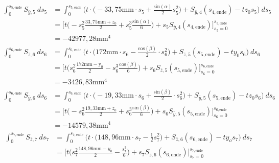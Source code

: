 \begin{itemize}
\begin{equation}
\begin{split}
			\int_{0}^{s_{5,\mathrm{ende}}} S_{\bar y,5}\ ds_5 &= \int_{0}^{s_{5,\mathrm{ende}}} \bigg(t\cdot\bigg(-33,75\mathrm{mm}\cdot s_5 +\frac{\mathrm{sin}(\alpha)}{2}s^2_5\bigg) + S_{\bar y,4}(s_{4,\mathrm{ende}})-tz_0s_5\bigg)\ ds_5\\\
			&=\bigg[t\bigg(-s_5^2\frac{33,75\mathrm{mm}+z_0}{2}+s_5^3\frac{\mathrm{sin}(\alpha)}{6}\bigg)+s_5S_{\bar y,4}(s_{4,\mathrm{ende}})\bigg]_{s_5=0}^{s_{5,\mathrm{ende}}}\\\
			&=-42977,28\mathrm{mm}^4
		\end{split}
	\end{equation}
	\begin{equation}
		\begin{split}
			\int_{0}^{s_{6,\mathrm{ende}}} S_{\bar z,6}\ ds_6 &= \int_{0}^{s_{6,\mathrm{ende}}} \bigg(t\cdot\bigg(172\mathrm{mm}\cdot s_6-\frac{\mathrm{cos}(\beta)}{2}\cdot s^2_6\bigg) + S_{\bar z,5}(s_{5,\mathrm{ende}})-ty_0s_6\bigg)\ ds_6\\\
			&=\bigg[t\bigg(s_6^2\frac{172\mathrm{mm-y_0}}{2}-s_6^3\frac{\mathrm{cos}(\beta)}{6}\bigg)+ s_6S_{\bar z,5}(s_{5,\mathrm{ende}})\bigg]_{s_6=0}^{s_{6,\mathrm{ende}}}\\\
			&=-3426,83\mathrm{mm}^4
		\end{split}
	\end{equation}
	\begin{equation}
		\begin{split}
			\int_{0}^{s_{6,\mathrm{ende}}} S_{\bar y,6}\ ds_6 &= \int_{0}^{s_{6,\mathrm{ende}}} \bigg(t\cdot\bigg(-19,33\mathrm{mm}\cdot s_6 + \frac{\mathrm{sin}(\beta)}{2}\cdot s^2_6\bigg) + S_{\bar y,5}(s_{5,\mathrm{ende}})-tz_0s_6\bigg)\ ds_6\\\
			&=\bigg[t\bigg(-s_6^2\frac{19,33\mathrm{mm}+z_0}{2}+s_6^3\frac{\mathrm{sin}(\beta)}{6}\bigg)+ s_6S_{\bar y,5}(s_{5,\mathrm{ende}})\bigg]_{s_6=0}^{s_{6,\mathrm{ende}}}\\\
			&=-14579,38\mathrm{mm}^4
		\end{split}
	\end{equation}
	\begin{equation}
		\begin{split}
			\int_{0}^{s_{7,\mathrm{ende}}} S_{\bar z,7}\ ds_7 &= \int_{0}^{s_{7,\mathrm{ende}}}\bigg(t\cdot\bigg(148,96\mathrm{mm}\cdot s_7-\frac{1}{2}s^2_7\bigg) + S_{\bar z,6}(s_{6,\mathrm{ende}})-ty_os_7\bigg)\ ds_7\\\
			&=\bigg[t\bigg(s_7^2\frac{148,96\mathrm{mm}-y_0}{2}-\frac{s_7^3}{6}\bigg)+s_7S_{\bar z,6}(s_{6,\mathrm{ende}})\bigg]_{s_7=0}^{s_{7,\mathrm{ende}}}\\\

\end{split}
\end{equation}
\end{itemize}
